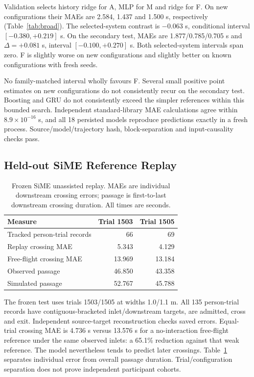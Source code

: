 Validation selects history ridge for A, MLP for M and ridge for F. On new configurations their MAEs are 2.584, 1.437 and 1.500 s, respectively (Table~\ref{tab:broad}). The selected-system contrast is $-0.063$ s, conditional interval $[-0.380,+0.219]$ s. On the secondary test, MAEs are 1.877/0.785/0.705 s and $\Delta=+0.081$ s, interval $[-0.100,+0.270]$ s. Both selected-system intervals span zero. F is slightly worse on new configurations and slightly better on known configurations with fresh seeds.

No family-matched interval wholly favours F. Several small positive point estimates on new configurations do not consistently recur on the secondary test. Boosting and GRU do not consistently exceed the simpler references within this bounded search. Independent standard-library MAE calculations agree within $8.9\times10^{-16}$ s, and all 18 persisted models reproduce predictions exactly in a fresh process. Source/model/trajectory hash, block-separation and input-causality checks pass.

\subsection{Held-out SiME Reference Replay}
\begin{table}[!t]\centering\small
\caption{Frozen SiME unassisted replay. MAEs are individual downstream crossing errors; passage is first-to-last downstream crossing duration. All times are seconds.}
\label{tab:sime}
\begin{tabular}{lrr}\toprule Measure & Trial 1503 & Trial 1505\\\midrule
Tracked person-trial records & 66 & 69\\
Replay crossing MAE & 5.343 & 4.129\\
Free-flight crossing MAE & 13.969 & 13.184\\
Observed passage & 46.850 & 43.358\\
Simulated passage & 52.767 & 45.788\\\bottomrule
\end{tabular}
\end{table}

The frozen test uses trials 1503/1505 at widths 1.0/1.1 m. All 135 person-trial records have contiguous-bracketed inlet/downstream targets, are admitted, cross and exit. Independent source-target reconstruction checks saved errors. Equal-trial crossing MAE is 4.736 s versus 13.576 s for a no-interaction free-flight reference under the same observed inlets: a 65.1\% reduction against that weak reference. The model nevertheless tends to predict later crossings. Table~\ref{tab:sime} separates individual error from overall passage duration. Trial/configuration separation does not prove independent participant cohorts.

